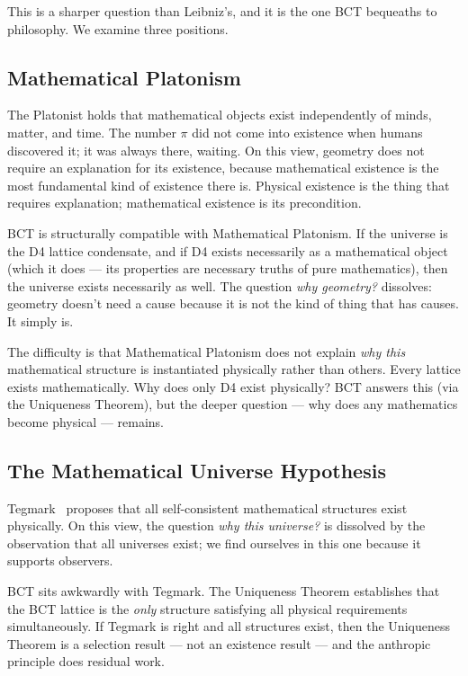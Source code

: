 \documentclass[aps,prl,twocolumn,superscriptaddress,floatfix]{revtex4-2}
\begin{document}
This is a sharper question than Leibniz's, and it is the one BCT 
bequeaths to philosophy. We examine three positions.

\subsection{Mathematical Platonism}

The Platonist holds that mathematical objects exist independently of 
minds, matter, and time. The number $\pi$ did not come into existence 
when humans discovered it; it was always there, waiting. On this view, 
geometry does not require an explanation for its existence, because 
mathematical existence is the most fundamental kind of existence there 
is. Physical existence is the thing that requires explanation; 
mathematical existence is its precondition.

BCT is structurally compatible with Mathematical Platonism. If the 
universe is the D4 lattice condensate, and if D4 exists necessarily 
as a mathematical object (which it does --- its properties are 
necessary truths of pure mathematics), then the universe exists 
necessarily as well. The question \emph{why geometry?} dissolves: 
geometry doesn't need a cause because it is not the kind of thing 
that has causes. It simply is.

The difficulty is that Mathematical Platonism does not explain 
\emph{why this} mathematical structure is instantiated physically 
rather than others. Every lattice exists mathematically. Why does 
only D4 exist physically? BCT answers this (via the Uniqueness 
Theorem), but the deeper question --- why does any mathematics 
become physical --- remains.

\subsection{The Mathematical Universe Hypothesis}

Tegmark~\cite{Tegmark2008} proposes that all self-consistent 
mathematical structures exist physically. On this view, the question 
\emph{why this universe?} is dissolved by the observation that all 
universes exist; we find ourselves in this one because it supports 
observers.

BCT sits awkwardly with Tegmark. The Uniqueness Theorem establishes 
that the BCT lattice is the \emph{only} structure satisfying all 
physical requirements simultaneously. If Tegmark is right and all 
structures exist, then the Uniqueness Theorem is a selection result 
--- not an existence result --- and the anthropic principle does 
residual work.
\end{document}
